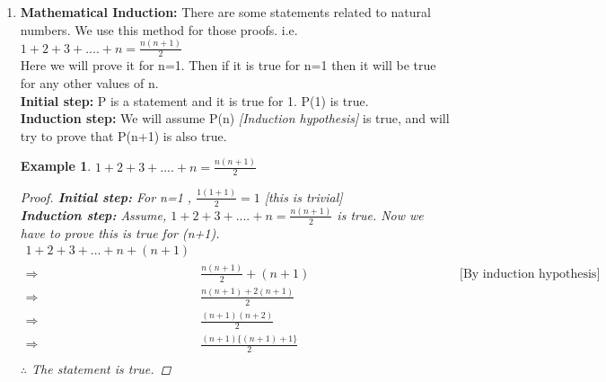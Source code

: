 \documentclass{article}
\newtheorem{example}{Example}[section]
\newcommand{\Rw}{\Rightarrow}
\newcommand{\hs}{\hspace}
\begin{document}
\begin{enumerate}
    \item \textbf{Mathematical Induction: } There are some statements related to natural numbers. We use this method for those proofs. i.e.\\
    $\displaystyle 1+2+3+....+n = \frac{n(n+1)}{2}$\\
    Here we will prove it for n=1. Then if it is true for n=1 then it will be true for any other values of n.\\
    \textbf{Initial step:} P is a statement and it is true for 1. P(1) is true.\\
    \textbf{Induction step:} We will assume P(n) \textit{[Induction hypothesis]} is true, and will try to prove that P(n+1) is also true.        
    \begin{example}
        $\displaystyle 1+2+3+....+n = \frac{n(n+1)}{2}$\\
        \begin{proof}
            \textbf{Initial step:} For n=1 , $\displaystyle \frac{1(1+1)}{2}=1$ \textit{[this is trivial]}\\
            \textbf{Induction step: } Assume, $\displaystyle 1+2+3+....+n = \frac{n(n+1)}{2}$ is true. Now we have to prove this is true for (n+1).
            \begin{align*}
                1+2+3+...+n+(n+1)\\
                \Rw & \frac{n(n+1)}{2}+(n+1) \hs{5cm} \text{[By induction hypothesis]}\\
                \Rw & \frac{n(n+1)+2(n+1)}{2}\\
                \Rw & \frac{(n+1)(n+2)}{2}\\
                \Rw & \frac{(n+1)\{(n+1)+1\}}{2}\\
            \end{align*}
            $\therefore$ The statement is true.
        \end{proof}
    \end{example}
\end{enumerate}
\end{document}
